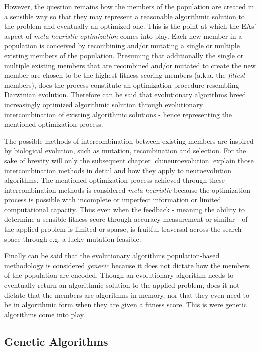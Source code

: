\documentclass[journal, a4paper]{IEEEtran}
\begin{document}
However, the question remains how the members of the population are created in a sensible way so that they may represent a reasonable algorithmic solution to the problem and eventually an optimized one. This is the point at which the EAs' aspect of \textit{meta-heuristic optimization} comes into play. Each new member in a population is conceived by recombining and/or mutating a single or multiple existing members of the population. Presuming that additionally the single or multiple existing members that are recombined and/or mutated to create the new member are chosen to be the highest fitness scoring members (a.k.a. the \textit{fittest} members), does the process constitute an optimization procedure resembling Darwinian evolution. Therefore can be said that evolutionary algorithms breed increasingly optimized algorithmic solution through evolutionary intercombination of existing algorithmic solutions - hence representing the mentioned optimization process. 

The possible methods of intercombination between existing members are inspired by biological evolution, such as mutation, recombination and selection. For the sake of brevity will only the subsequent chapter \ref{ch:neuroevolution} explain those intercombination methods in detail and how they apply to neuroevolution algorithms. The mentioned optimization process achieved through these intercombination methods is considered \textit{meta-heuristic} because the optimization process is possible with incomplete or imperfect information or limited computational capacity. Thus even when the feedback - meaning the ability to determine a sensible fitness score through accuracy measurement or similar - of the applied problem is limited or sparse, is fruitful traversal across the search-space through e.g. a lucky mutation feasible.

Finally can be said that the evolutionary algorithms population-based methodology is considered \textit{generic} because it does not dictate how the members of the population are encoded. Though an evolutionary algorithm needs to eventually return an algorithmic solution to the applied problem, does it not dictate that the members are algorithms in memory, nor that they even need to be in algorithmic form when they are given a fitness score. This is were genetic algorithms come into play.



\subsection{Genetic Algorithms}
\end{document}
